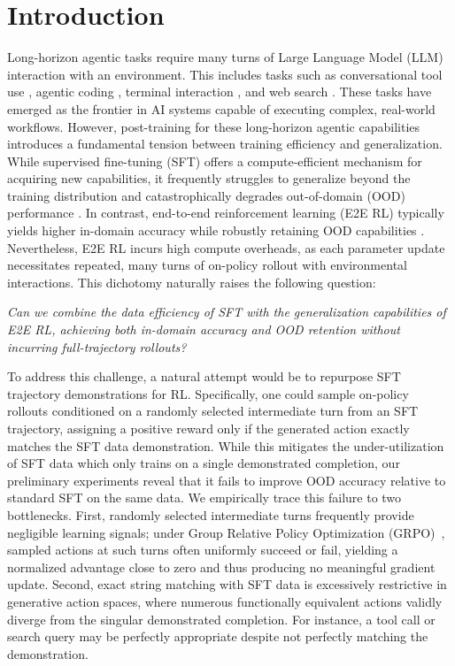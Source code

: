 \section{Introduction}

Long-horizon agentic tasks require many turns of Large Language Model (LLM) interaction with an environment. This includes tasks such as conversational tool use \citep{schick2023toolformer, qin2023toolllm}, agentic coding \citep{jimenez2024swebench}, terminal interaction \citep{xie2024osworld}, and web search \citep{yao2022webshop, wei2025browsecompsimplechallengingbenchmark}. These tasks have emerged as the frontier in AI systems capable of executing complex, real-world workflows. However, post-training for these long-horizon agentic capabilities introduces a fundamental tension between training efficiency and generalization. 
While supervised fine-tuning (SFT) offers a compute-efficient mechanism for acquiring new capabilities, it frequently struggles to generalize beyond the training distribution and catastrophically degrades out-of-domain (OOD) performance \citep{chu2025sftmemorizesrlgeneralizes, luo2023empiricalCF}. In contrast, end-to-end reinforcement learning (E2E RL) typically yields higher in-domain accuracy while robustly retaining OOD capabilities \citep{ouyang2022training, chen2025retainingdoingroleonpolicy}. Nevertheless, E2E RL incurs high compute overheads, as each parameter update necessitates repeated, many turns of on-policy rollout with environmental interactions. This dichotomy naturally raises the following question:
\begin{center}
    \emph{Can we combine the data efficiency of SFT with the generalization capabilities of E2E RL, achieving both in-domain accuracy and OOD retention without incurring full-trajectory rollouts?}
\end{center}
To address this challenge, a natural {attempt would be to repurpose SFT trajectory demonstrations for RL.} 
Specifically, one could sample on-policy rollouts conditioned on a randomly selected intermediate turn from an SFT trajectory, assigning a positive reward only if the generated action exactly matches the SFT data demonstration. While this mitigates the under-utilization of SFT data which only trains on a single demonstrated completion, our preliminary experiments reveal that it fails to improve OOD accuracy relative to standard SFT on the same data. We empirically trace this failure to two bottlenecks. First, randomly selected intermediate turns frequently provide negligible learning signals; under Group Relative Policy Optimization (GRPO)~\citep{shao2024deepseekmath}, sampled actions at such turns often uniformly succeed or fail, yielding a normalized advantage close to zero and thus producing no meaningful gradient update. Second, exact string matching with SFT data is excessively restrictive in generative action spaces, where numerous functionally equivalent actions validly diverge from the singular demonstrated completion. For instance, a tool call or search query may be perfectly appropriate despite not perfectly matching the demonstration. 

